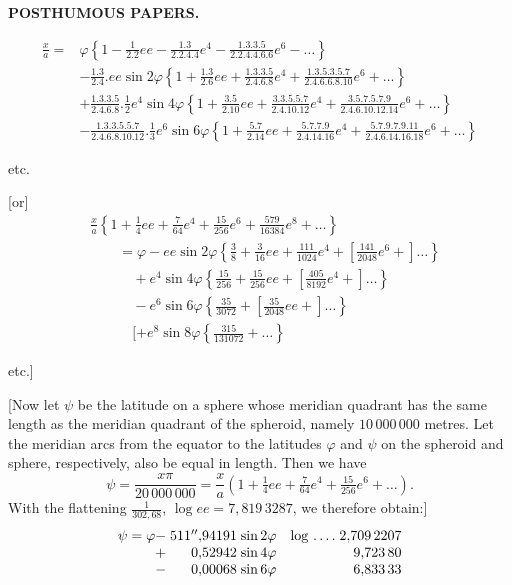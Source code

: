 \par\clearpage
{}\hfill{\small\textbf{POSTHUMOUS PAPERS.}}\hfill\null\par\medskip
\[
\begin{aligned}
\frac{x}{a}={}&\varphi\left\{1-\frac1{2.2}ee-\frac{1.3}{2.2.4.4}e^4-\frac{1.3.3.5}{2.2.4.4.6.6}e^6-\ldots\right\}\\
&-\frac{1.3}{2.4}.ee\sin2\varphi\left\{1+\frac{1.3}{2.6}ee+\frac{1.3.3.5}{2.4.6.8}e^4+\frac{1.3.5.3.5.7}{2.4.6.6.8.10}e^6+\ldots\right\}\\
&+\frac{1.3.3.5}{2.4.6.8}.\tfrac12e^4\sin4\varphi\left\{1+\frac{3.5}{2.10}ee+\frac{3.3.5.5.7}{2.4.10.12}e^4+\frac{3.5.7.5.7.9}{2.4.6.10.12.14}e^6+\ldots\right\}\\
&-\frac{1.3.3.5.5.7}{2.4.6.8.10.12}.\tfrac13e^6\sin6\varphi\left\{1+\frac{5.7}{2.14}ee+\frac{5.7.7.9}{2.4.14.16}e^4+\frac{5.7.9.7.9.11}{2.4.6.14.16.18}e^6+\ldots\right\}
\end{aligned}
\]
{\centering etc.\par}
[or]
\[
\begin{aligned}
&\frac{x}{a}\left\{1+\tfrac14ee+\tfrac7{64}e^4+\tfrac{15}{256}e^6+\tfrac{579}{16384}e^8+\ldots\right\}\\
&\qquad=\varphi-ee\sin2\varphi\left\{\tfrac38+\tfrac3{16}ee+\tfrac{111}{1024}e^4+[\tfrac{141}{2048}e^6+]\ldots\right\}\\
&\qquad\quad+e^4\sin4\varphi\left\{\tfrac{15}{256}+\tfrac{15}{256}ee+[\tfrac{405}{8192}e^4+]\ldots\right\}\\
&\qquad\quad-e^6\sin6\varphi\left\{\tfrac{35}{3072}+[\tfrac{35}{2048}ee+]\ldots\right\}\\
&\qquad\quad[+e^8\sin8\varphi\left\{\tfrac{315}{131072}+\ldots\right\}
\end{aligned}
\]
{\centering etc.]\par}
[Now let \(\psi\) be the latitude on a sphere whose meridian quadrant has the same length as the meridian quadrant of the spheroid, namely \(10\,000\,000\) metres. Let the meridian arcs from the equator to the latitudes \(\varphi\) and \(\psi\) on the spheroid and sphere, respectively, also be equal in length. Then we have
\[
\psi=\frac{x\pi}{20\,000\,000}=\frac{x}{a}\left(1+\tfrac14ee+\tfrac7{64}e^4+\tfrac{15}{256}e^6+\ldots\right).
\]
With the flattening \(\frac1{302{,}68}\), \(\log ee=7{,}819\,3287\), we therefore obtain:]
\[
\begin{array}{@{}r@{\;}r@{\;}l@{\quad}l@{\;}r@{}}
\psi=\varphi-&511''{,}94191&\sin2\varphi&\log\,.\,.\,.\,.&2{,}709\,2207\\
+&0{,}52942&\sin4\varphi&&9{,}723\,80\\
-&0{,}00068&\sin6\varphi&&6{,}833\,33
\end{array}
\]
